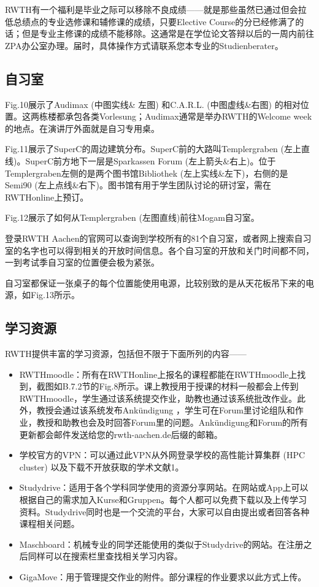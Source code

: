     RWTH有一个福利是毕业之际可以移除不良成绩——就是那些虽然已通过但会拉低总绩点的专业选修课和辅修课的成绩，只要Elective Course的分已经修满了的话；但是专业主修课的成绩不能移除。这通常是在学位论文答辩以后的一周内前往ZPA办公室办理。届时，具体操作方式请联系您本专业的Studienberater。

  \subsection{自习室}\label{subsec:自习室}

    Fig.10展示了Audimax (中图实线\& 左图) 和C.A.R.L. (中图虚线\&右图) 的相对位置。这两栋楼都承包各类Vorlesung；Audimax通常是举办RWTH的Welcome week的地点。在演讲厅外面就是自习专用桌。

    Fig.11展示了SuperC的周边建筑分布。SuperC前的大路叫Templergraben (左上直线)。SuperC前方地下一层是Sparkassen Forum (左上箭头\&右上)。位于Templergraben左侧的是两个图书馆Bibliothek (左上实线\&左下)，右侧的是Semi90 (左上点线\&右下)。图书馆有用于学生团队讨论的研讨室，需在RWTHonline上预订。

    Fig.12展示了如何从Templergraben (左图直线)前往Mogam自习室。

    登录RWTH Aachen的官网可以查询到学校所有的81个自习室，或者网上搜索自习室的名字也可以得到相关的开放时间信息。各个自习室的开放和关门时间都不同，一到考试季自习室的位置便会极为紧张。

    自习室都保证一张桌子的每个位置能使用电源，比较别致的是从天花板吊下来的电源，如Fig.13所示。

  \subsection{学习资源}\label{subsec:学习资源}

    RWTH提供丰富的学习资源，包括但不限于下面所列的内容——

    \begin{itemize}
      \item RWTHmoodle：所有在RWTHonline上报名的课程都能在RWTHmoodle上找到，截图如B.7.2节的Fig.8所示。课上教授用于授课的材料一般都会上传到RWTHmoodle，学生通过该系统提交作业，助教也通过该系统批改作业。此外，教授会通过该系统发布Ankündigung ，学生可在Forum里讨论组队和作业，教授和助教也会及时回答Forum里的问题。Ankündigung和Forum的所有更新都会邮件发送给您的rwth-aachen.de后缀的邮箱。
      \item 学校官方的VPN：可以通过此VPN从外网登录学校的高性能计算集群 (HPC cluster) 以及下载不开放获取的学术文献1。
      \item Studydrive：适用于各个学科同学使用的资源分享网站。在网站或App上可以根据自己的需求加入Kurse和Gruppen。每个人都可以免费下载以及上传学习资料。Studydrive同时也是一个交流的平台，大家可以自由提出或者回答各种课程相关问题。
      \item Maschboard：机械专业的同学还能使用的类似于Studydrive的网站。在注册之后同样可以在搜索栏里查找相关学习内容。
      \item GigaMove：用于管理提交作业的附件。部分课程的作业要求以此方式上传。
    \end{itemize}

